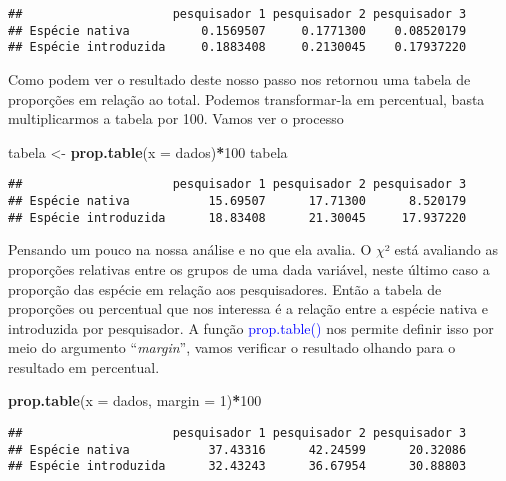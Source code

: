 \documentclass[14pt,titlepage, oneside, openany, a4paper]{book}
\newenvironment{Shaded}{\begin{snugshade}}{\end{snugshade}}
\newcommand{\DataTypeTok}[1]{\textcolor[rgb]{0.13,0.29,0.53}{#1}}
\newcommand{\DecValTok}[1]{\textcolor[rgb]{0.00,0.00,0.81}{#1}}
\newcommand{\KeywordTok}[1]{\textcolor[rgb]{0.13,0.29,0.53}{\textbf{#1}}}
\newcommand{\NormalTok}[1]{#1}
\newcommand{\OperatorTok}[1]{\textcolor[rgb]{0.81,0.36,0.00}{\textbf{#1}}}
\newcommand{\StringTok}[1]{\textcolor[rgb]{0.31,0.60,0.02}{#1}}
\begin{document}
\begin{verbatim}
##                     pesquisador 1 pesquisador 2 pesquisador 3
## Espécie nativa          0.1569507     0.1771300    0.08520179
## Espécie introduzida     0.1883408     0.2130045    0.17937220
\end{verbatim}

Como podem ver o resultado deste nosso passo nos retornou uma tabela de proporções em relação ao total. Podemos transformar-la em percentual, basta multiplicarmos a tabela por 100. Vamos ver o processo

\begin{Shaded}
\begin{Highlighting}[]
\NormalTok{tabela <-}\StringTok{ }\KeywordTok{prop.table}\NormalTok{(}\DataTypeTok{x =}\NormalTok{ dados)}\OperatorTok{*}\DecValTok{100}
\NormalTok{tabela}
\end{Highlighting}
\end{Shaded}

\begin{verbatim}
##                     pesquisador 1 pesquisador 2 pesquisador 3
## Espécie nativa           15.69507      17.71300      8.520179
## Espécie introduzida      18.83408      21.30045     17.937220
\end{verbatim}

Pensando um pouco na nossa análise e no que ela avalia. O \(\chi\)² está avaliando as proporções relativas entre os grupos de uma dada variável, neste último caso a proporção das espécie em relação aos pesquisadores. Então a tabela de proporções ou percentual que nos interessa é a relação entre a espécie nativa e introduzida por pesquisador. A função \textcolor{blue}{prop.table()} nos permite definir isso por meio do argumento ``\emph{margin}'', vamos verificar o resultado olhando para o resultado em percentual.

\begin{Shaded}
\begin{Highlighting}[]
\KeywordTok{prop.table}\NormalTok{(}\DataTypeTok{x =}\NormalTok{ dados, }\DataTypeTok{margin =} \DecValTok{1}\NormalTok{)}\OperatorTok{*}\DecValTok{100}
\end{Highlighting}
\end{Shaded}

\begin{verbatim}
##                     pesquisador 1 pesquisador 2 pesquisador 3
## Espécie nativa           37.43316      42.24599      20.32086
## Espécie introduzida      32.43243      36.67954      30.88803
\end{verbatim}
\end{document}
